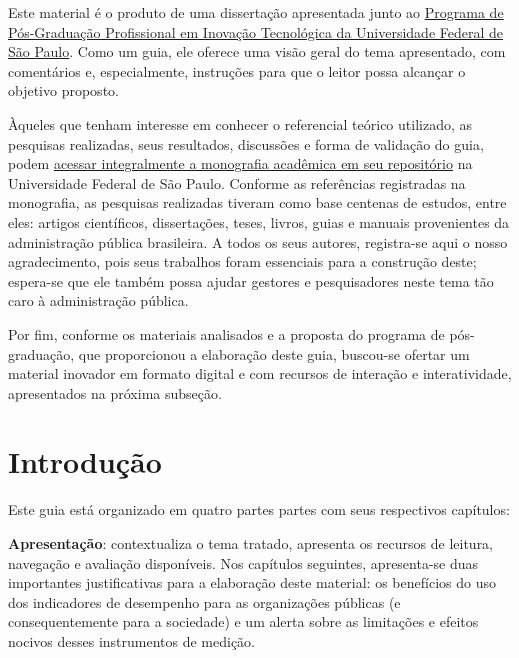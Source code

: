 \documentclass[
  letterpaper,
  DIV=11,
  numbers=noendperiod]{scrreprt}
\begin{document}

Este material é o produto de uma dissertação apresentada junto ao
\href{https://www.unifesp.br/campus/sjc/ppgit}{Programa de Pós-Graduação
Profissional em Inovação Tecnológica da Universidade Federal de São
Paulo}. Como um guia, ele oferece uma visão geral do tema apresentado,
com comentários e, especialmente, instruções para que o leitor possa
alcançar o objetivo proposto.

Àqueles que tenham interesse em conhecer o referencial teórico
utilizado, as pesquisas realizadas, seus resultados, discussões e forma
de validação do guia, podem
\href{https://repositorio.unifesp.br/handle/11600/61097}{acessar
integralmente a monografia acadêmica em seu repositório} na Universidade
Federal de São Paulo. Conforme as referências registradas na monografia,
as pesquisas realizadas tiveram como base centenas de estudos, entre
eles: artigos científicos, dissertações, teses, livros, guias e manuais
provenientes da administração pública brasileira. A todos os seus
autores, registra-se aqui o nosso agradecimento, pois seus trabalhos
foram essenciais para a construção deste; espera-se que ele também possa
ajudar gestores e pesquisadores neste tema tão caro à administração
pública.

Por fim, conforme os materiais analisados e a proposta do programa de
pós-graduação, que proporcionou a elaboração deste guia, buscou-se
ofertar um material inovador em formato digital e com recursos de
interação e interatividade, apresentados na próxima subseção.


\hypertarget{introduuxe7uxe3o}{%
\chapter*{Introdução}\label{introduuxe7uxe3o}}


Este guia está organizado em quatro partes partes com seus respectivos
capítulos:

\textbf{Apresentação}: contextualiza o tema tratado, apresenta os
recursos de leitura, navegação e avaliação disponíveis. Nos capítulos
seguintes, apresenta-se duas importantes justificativas para a
elaboração deste material: os benefícios do uso dos indicadores de
desempenho para as organizações públicas (e consequentemente para a
sociedade) e um alerta sobre as limitações e efeitos nocivos desses
instrumentos de medição.
\end{document}
